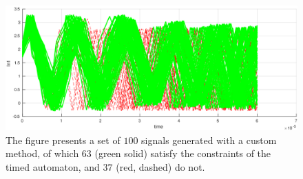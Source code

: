 \begin{figure}[htbp]
  \centering
  \includegraphics[width=\textwidth]{inputs_reject.png}
  \caption{The figure presents a set of $100$ signals generated with a custom method, of which 63 (green solid) satisfy the constraints of the timed automaton, and $37$ (red, dashed) do not.}
  \label{fig:reject}
\end{figure}

